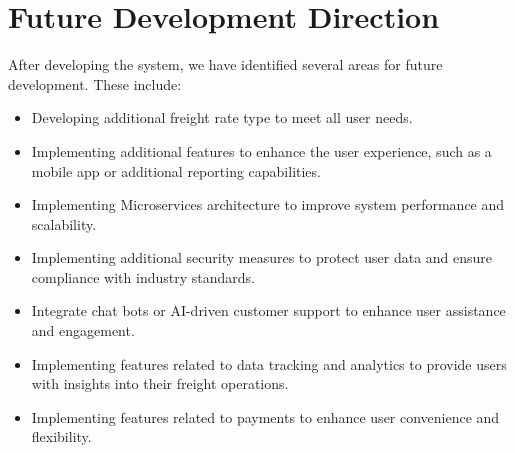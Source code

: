 \section{Future Development Direction}
After developing the system, we have identified several areas for future development. These include:
\begin{itemize}
  \item Developing additional freight rate type to meet all user needs.
  \item Implementing additional features to enhance the user experience, such as a mobile app or additional reporting capabilities.
  \item Implementing Microservices architecture to improve system performance and scalability.
  \item Implementing additional security measures to protect user data and ensure compliance with industry standards.
  \item Integrate chat bots or AI-driven customer support to enhance user assistance and engagement.
  \item Implementing features related to data tracking and analytics to provide users with insights into their freight operations.
  \item Implementing features related to payments to enhance user convenience and flexibility.
\end{itemize}
